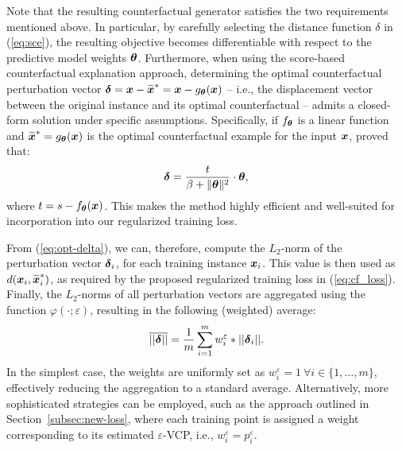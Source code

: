 Note that the resulting counterfactual generator satisfies the two requirements mentioned above. In particular, by carefully selecting the distance function $\delta$ in (\ref{eq:sce}), the resulting objective becomes differentiable with respect to the predictive model weights 
$\boldsymbol{\theta}$. Furthermore, when using the score-based counterfactual explanation approach, determining the optimal counterfactual perturbation vector $\boldsymbol{\delta} = \boldsymbol{x} - \widetilde{\boldsymbol{x}}^* = \boldsymbol{x} - g_{\boldsymbol{\theta}}(\boldsymbol{x})$ -- i.e., the displacement vector between the original instance and its optimal counterfactual -- admits a closed-form solution under specific assumptions. Specifically, if $f_{\boldsymbol{\theta}}$ is a linear function and $\widetilde{\boldsymbol{x}}^* = g_{\boldsymbol{\theta}}(\boldsymbol{x})$ is the optimal counterfactual example for the input $\boldsymbol{x}$, \citet{pawelczyk2022ijcai} proved that:
\begin{equation}
\label{eq:opt-delta}
    \boldsymbol{\delta} = \frac{t}{\beta + \|\boldsymbol{\theta}\|^2} \cdot \boldsymbol{\theta},
\end{equation}
where $t = s - f_{\boldsymbol{\theta}}(\boldsymbol{x})$.
This makes the method highly efficient and well-suited for incorporation into our regularized training loss.

From (\ref{eq:opt-delta}), we can, therefore, compute the $L_2$-norm of the perturbation vector $\boldsymbol{\delta}_i$, for each training instance $\boldsymbol{x}_i$. This value is then used as $d(\boldsymbol{x}_i, \widetilde{\boldsymbol{x}}^*_i)$, as required by the proposed regularized training loss in (\ref{eq:cf_loss}).
Finally, the $L_2$-norms of all perturbation vectors are aggregated using the function $\varphi(\cdot;\varepsilon)$, resulting in the following (weighted) average: 
\begin{equation}
\label{eq:agg-delta}
\overline{||\boldsymbol{\delta}||} = \frac{1}{m}\sum_{i=1}^m w_i^{\varepsilon}*||\boldsymbol{\delta}_i||.
\end{equation}
In the simplest case, the weights are uniformly set as $w_i^{\varepsilon} = 1~\forall i\in \{1,\ldots,m\}$, effectively reducing the aggregation to a standard average. Alternatively, more sophisticated strategies can be employed, such as the approach outlined in Section~\ref{subsec:new-loss}, where each training point is assigned a weight corresponding to its estimated $\varepsilon$-VCP, i.e., $w_i^{\varepsilon} = p_i^{\varepsilon}$.


